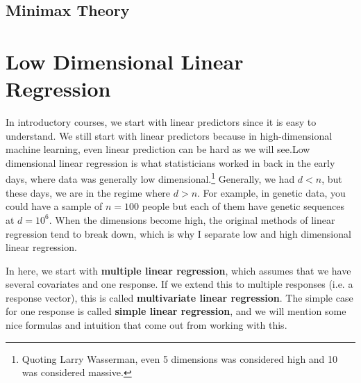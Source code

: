 \documentclass{article}
\begin{document}
  \subsection{Minimax Theory}

\section{Low Dimensional Linear Regression}

    In introductory courses, we start with linear predictors since it is easy to understand. We still start with linear predictors because in high-dimensional machine learning, even linear prediction can be hard as we will see.Low dimensional linear regression is what statisticians worked in back in the early days, where data was generally low dimensional.\footnote{Quoting Larry Wasserman, even 5 dimensions was considered high and 10 was considered massive. } Generally, we had $d < n$, but these days, we are in the regime where $d > n$. For example, in genetic data, you could have a sample of $n = 100$ people but each of them have genetic sequences at $d = 10^6$. When the dimensions become high, the original methods of linear regression tend to break down, which is why I separate low and high dimensional linear regression. 

    In here, we start with \textbf{multiple linear regression}, which assumes that we have several covariates and one response. If we extend this to multiple responses (i.e. a response vector), this is called \textbf{multivariate linear regression}. The simple case for one response is called \textbf{simple linear regression}, and we will mention some nice formulas and intuition that come out from working with this. 
\end{document}
